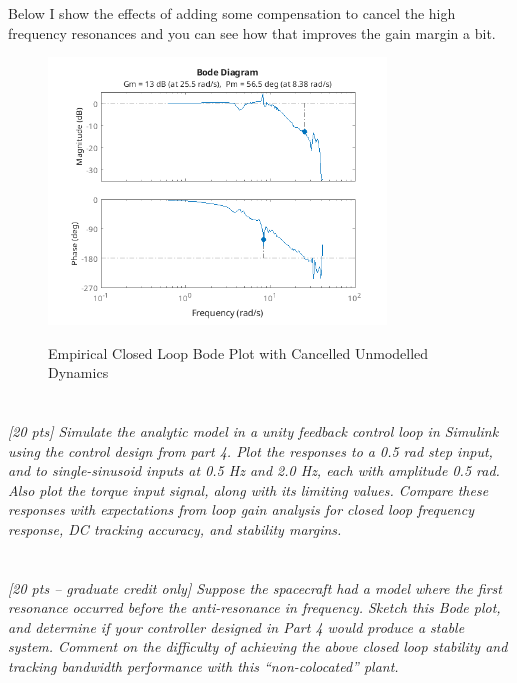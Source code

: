 \documentclass{article}
\begin{document}
Below I show the effects of adding some compensation to cancel the high frequency resonances and you can see how that improves the gain margin a bit.

\begin{figure}[H]
    \centering
    \includegraphics[width=0.8\textwidth]{feedbackEmpiricalCancelled.png}
    \label{fig:feedbackEmpiricalCancelled}
    \caption{Empirical Closed Loop Bode Plot with Cancelled Unmodelled Dynamics}
\end{figure}

\section{}

\textit{[20 pts] Simulate the analytic model in a unity feedback control loop in Simulink using the control design from part 4. Plot the responses to a 0.5 rad step input, and to single-sinusoid inputs at 0.5 Hz and 2.0 Hz, each with amplitude 0.5 rad. Also plot the torque input signal, along with its limiting values. Compare these responses with expectations from loop gain analysis for closed loop frequency response, DC tracking accuracy, and stability margins.}

\section{}

\textit{[20 pts – graduate credit only] Suppose the spacecraft had a model where the first resonance occurred before the anti-resonance in frequency. Sketch this Bode plot, and determine if your controller designed in Part 4 would produce a stable system. Comment on the difficulty of achieving the above closed loop stability and tracking bandwidth performance with this “non-colocated” plant.}
\end{document}
